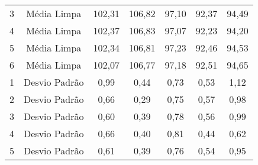 \begin{table}[]
\begin{tabular}{|c|c|ccccc|}
3                         & Média Limpa                                                                & 102,31                     & 106,82                     & 97,10                     & 92,37                     & 94,49                      \\
4                         & Média Limpa                                                                & 102,37                     & 106,83                     & 97,07                     & 92,23                     & 94,20                      \\
5                         & Média Limpa                                                                & 102,34                     & 106,81                     & 97,23                     & 92,46                     & 94,53                      \\
6                         & Média Limpa                                                                & 102,07                     & 106,77                     & 97,18                     & 92,51                     & 94,65                      \\ \hline
1                         & Desvio Padrão                                                              & 0,99                       & 0,44                       & 0,73                      & 0,53                      & 1,12                       \\
2                         & Desvio Padrão                                                              & 0,66                       & 0,29                       & 0,75                      & 0,57                      & 0,98                       \\
3                         & Desvio Padrão                                                              & 0,60                       & 0,39                       & 0,78                      & 0,56                      & 0,99                       \\
4                         & Desvio Padrão                                                              & 0,66                       & 0,40                       & 0,81                      & 0,44                      & 0,62                       \\
5                         & Desvio Padrão                                                              & 0,61                       & 0,39                       & 0,76                      & 0,54                      & 0,95                       \\

\end{tabular}
\end{table}
